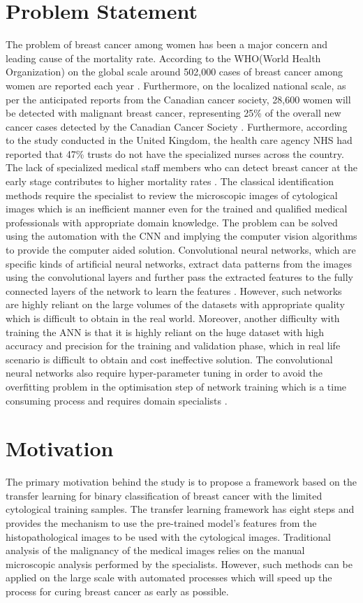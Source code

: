 \section{Problem Statement}
The problem of breast cancer among women has been a major concern and leading cause of the mortality rate.
According to the WHO(World Health Organization) on the global scale around 502,000 cases of breast cancer among women are reported each year \citep*{jelen2008classification}. 
Furthermore, on the localized national scale, as per the anticipated reports from the Canadian cancer society, 28,600 women will be detected 
with malignant breast cancer, representing 25\% of the overall new cancer cases detected by the Canadian Cancer Society \citet{CanadianCancerSociety}.
Furthermore, according to the study conducted in the United Kingdom, the health care agency NHS had reported that 47\% trusts do not have the 
specialized nurses across the country. The lack of specialized medical staff members who can detect breast cancer at the early stage contributes to higher mortality rates \citep{tan2017breast}. 
The classical identification methods require the specialist to review the microscopic images of cytological images which is an inefficient manner even for the trained and qualified medical professionals with appropriate domain knowledge.
The problem can be solved using the automation with the CNN and implying the computer vision algorithms to provide the computer aided solution. Convolutional neural networks, 
which are specific kinds of artificial neural networks, extract data patterns 
from the images using the convolutional layers and further pass the extracted features to the fully connected 
layers of the network to learn the features \citep{wani2020basics}. 
However, such networks are highly reliant on the large volumes of the datasets with appropriate quality which is difficult to obtain in the real world. Moreover, 
another difficulty with training the ANN is that it is highly reliant on the huge dataset with high accuracy and precision for the training and validation phase,
which in real life scenario is difficult to obtain and cost ineffective solution. The convolutional neural networks also require hyper-parameter tuning
in order to avoid the overfitting problem in the optimisation step of network training which is a time consuming process 
and requires domain specialists \citep{srivastava2014dropout}.


\section{Motivation}
The primary motivation behind the study is to propose a framework based on the transfer learning for binary classification of breast cancer with the limited cytological training samples. 
The transfer learning framework has eight steps and provides the mechanism to use the pre-trained model’s features from the histopathological
images to be used with the cytological images. Traditional analysis of the malignancy of the medical images relies on the manual microscopic analysis performed by the specialists. 
However, such methods can be applied on the large scale with automated processes which will speed up the process for curing breast cancer as early as possible. 

